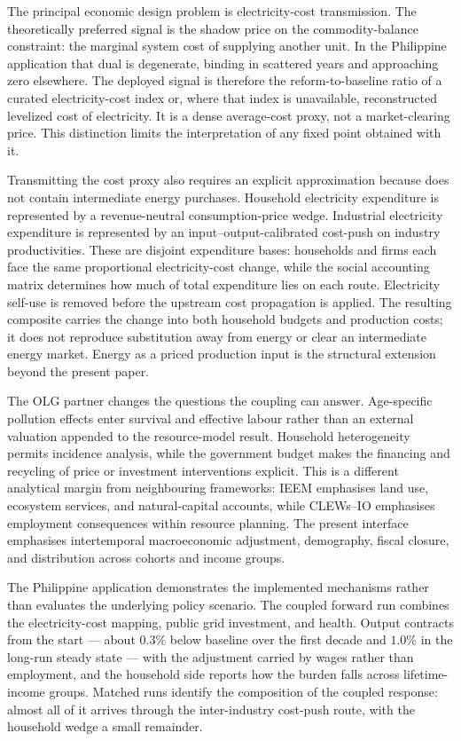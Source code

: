 The principal economic design problem is electricity-cost transmission. The theoretically
preferred signal is the shadow price on the \OSeMOSYS{} commodity-balance constraint: the
marginal system cost of supplying another unit. In the Philippine application that dual
is degenerate, binding in scattered years and approaching zero elsewhere. The deployed
signal is therefore the reform-to-baseline ratio of a curated electricity-cost index or,
where that index is unavailable, reconstructed levelized cost of electricity. It is a
dense average-cost proxy, not a market-clearing price. This distinction limits the
interpretation of any fixed point obtained with it.

Transmitting the cost proxy also requires an explicit approximation because \OGCore{}
does not contain intermediate energy purchases. Household electricity expenditure is
represented by a revenue-neutral consumption-price wedge. Industrial electricity
expenditure is represented by an input--output-calibrated cost-push on industry
productivities. These are disjoint expenditure bases: households and firms each face the
same proportional electricity-cost change, while the social accounting matrix determines
how much of total expenditure lies on each route. Electricity self-use is removed before
the upstream cost propagation is applied. The resulting composite carries the change into
both household budgets and production costs; it does not reproduce substitution away from
energy or clear an intermediate energy market. Energy as a priced production input is the
structural extension beyond the present paper.

The OLG partner changes the questions the coupling can answer. Age-specific pollution
effects enter survival and effective labour rather than an external valuation appended to
the resource-model result. Household heterogeneity permits incidence analysis, while the
government budget makes the financing and recycling of price or investment interventions
explicit. This is a different analytical margin from neighbouring frameworks: IEEM
emphasises land use, ecosystem services, and natural-capital accounts, while CLEWs--IO
emphasises employment consequences within resource planning. The present interface
emphasises intertemporal macroeconomic adjustment, demography, fiscal closure, and
distribution across cohorts and income groups.

The Philippine application demonstrates the implemented mechanisms rather than evaluates
the underlying policy scenario. The coupled forward run combines the electricity-cost
mapping, public grid investment, and health. Output contracts from the start ---
about $0.3\%$ below baseline over the first decade and $1.0\%$ in the long-run steady
state --- with the adjustment carried by wages rather than employment, and the
household side reports how the burden falls across lifetime-income groups. Matched
runs identify the composition of the coupled response: almost all of it arrives
through the inter-industry cost-push route, with the household wedge a small
remainder.

